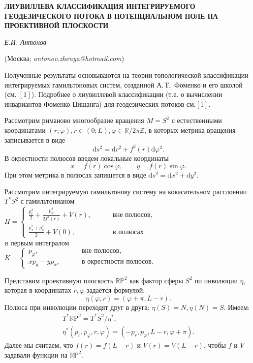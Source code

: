 
\begin{center}
    {\bf ЛИУВИЛЛЕВА КЛАССИФИКАЦИЯ ИНТЕГРИРУЕМОГО ГЕОДЕЗИЧЕСКОГО ПОТОКА В ПОТЕНЦИАЛЬНОМ ПОЛЕ НА ПРОЕКТИВНОЙ ПЛОСКОСТИ}

    {\it Е.И. Антонов}

    (Москва; {\it antonov.zhenya@hotmail.com})
\end{center}





Полученные результаты основываются на теории топологической классификации интегрируемых гамильтоновых систем, созданной А.\,Т.~Фоменко и его школой (см. $\left[1\right]$). Подробнее о лиувиллевой классификации (т.е. о вычислении инвариантов Фоменко-Цишанга) для геодезических потоков см.$\left[1\right]$.



Рассмотрим риманово многообразие вращения $M=S^2$ с естественными координатами $(r;\varphi), r \in (0;L), \varphi \in \mathbb{R}/2\pi\mathbb{Z}$, в которых метрика вращения записывается в виде
\[\mathrm{d}s^2=\mathrm{d}r^2+f^2(r)\mathrm{d}\varphi^2.\] В окрестности полюсов введем локальные координаты
\[x=f(r)\cos{\varphi},\qquad y=f(r)\sin{\varphi}.\] При этом метрика в полюсах запишется в виде $\mathrm{d}s^2=\mathrm{d}x^2+\mathrm{d}y^2$.


Рассмотрим интегрируемую гамильтонову систему на кокасательном расслоении $T^*S^2$ с гамильтонианом
\\
$ H = \begin{cases} \displaystyle \frac{p^2_{r}}{2}+\frac{p^2_{\varphi}}{2f^2(r)}+V(r),  \qquad & \text{ вне полюсов,} \\ \displaystyle \frac{p^2_{x}+p^2_{y}}{2}+V(0), \qquad & \text{ в полюсах} \end{cases}  $
\\
и первым интегралом
\\
 $K= \begin{cases} p_{\varphi}, \qquad  &\text{ вне полюсов,} \\ xp_{y}-yp_{x}, \qquad & \text{ в окрестности полюсов.}  \end{cases} $



Представим проективную плоскость $\mathbb{RP}^2$ как фактор сферы $S^2$ по инволюции $\eta$, которая в координатах $r,\varphi$ задаётся формулой: \[ \eta (\varphi, r) = (\varphi + \pi, L-r).\] Полюса при инволюции переходят друг в друга:  $\eta (S)=N,\eta(N)=S$. Имеем:  \begin{gather*}
 T^{*}\mathbb{R}\mathrm{P}^2=T^{*}S^2/\eta ^{*},\\
 \eta^{*}(p_{r},p_{\varphi},r,\varphi)=(-p_{r},p_{\varphi},L-r,\varphi+\pi).
 \end{gather*} Далее мы считаем, что $f(r)=f(L-r)$ и $V(r) = V(L-r)$, чтобы $f$ и $V$ задавали функции на $\mathbb{RP}^2$.


